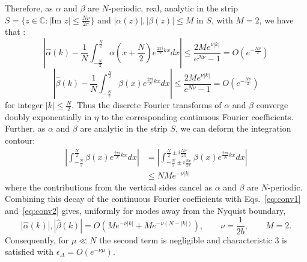 \documentclass[aps,floatfix,10pt,amssymb,amsfont,amsmath,superscriptaddress,float,nofootinbib,longbibliography,nobalancelastpage,twocolumn]{revtex4-2}
\begin{document}
Therefore, as $\alpha$ and $\beta$ are $N$-periodic, real, analytic in the strip $S =\{z \in \mathbb{C}: |\text{Im } z| \leq \frac{N\nu}{2\pi}\}$ and $|\alpha(z)|, |\beta(z)| \leq M$ in $S$, with $M = 2$, we have that \cite{trefethen2014exponentially}:
\begin{equation}
\label{eq:conv1}
    \left|\hat\alpha(k) - \frac{1}{N}\int_{-\frac{N}{2}}^{\frac{N}{2}}\alpha(x+\frac{N}{2})e^{\frac{2\pi i}{N}kx} dx\right| \leq \frac{2 Me^{\nu |k|}}{e^{N\nu}-1} = O(e^{-\frac{N\nu}{2}})
\end{equation}
\begin{equation}
\label{eq:conv2}
    \left|\hat\beta(k) - \frac{1}{N}\int_{-\frac{N}{2}}^{\frac{N}{2}}\beta(x)e^{\frac{2\pi i}{N}kx} dx\right| \leq  \frac{2 Me^{\nu |k|}}{e^{N\nu}-1} = O(e^{-\frac{N\nu}{2}})
\end{equation}
for integer $|k| \leq \frac{N}{2}$. Thus the discrete Fourier transforms of $\alpha$ and $\beta$ converge doubly exponentially in $\eta$ to the corresponding continuous Fourier coefficients. Further, as $\alpha$ and $\beta$ are analytic in the strip $S$, we can deform the integration contour:
\begin{align}
    \left|\int_{-\frac{N}{2}}^{\frac{N}{2}}\beta(x)e^{\frac{2\pi i}{N}kx} dx\right| &=\left| \int_{-\frac{N}{2}\pm i\frac{N\nu}{2\pi}}^{\frac{N}{2}\pm i\frac{N\nu}{2\pi}}\beta(x)e^{\frac{2\pi i}{N}kx} dx\right|\\
    &\leq NMe^{-\nu|k|}
    \label{eq:tails}
\end{align}
where the contributions from the vertical sides cancel as $\alpha$ and $\beta$ are $N$-periodic. Combining this decay of the continuous Fourier coefficients with Eqs.~\eqref{eq:conv1} and~\eqref{eq:conv2} gives, uniformly for modes away from the Nyquist boundary,
\begin{equation}
\label{eq:exactdecay}
    |\hat \alpha(k)|, |\hat \beta(k)| = O\!\left(M e^{-\nu|k|}
    +M e^{-\nu(N-|k|)}\right),
    \qquad \nu = \frac{1}{2b}, \qquad M=2.
\end{equation}
Consequently, for $\mu\ll N$ the second term is negligible and characteristic 3 is satisfied with $\epsilon_{\Delta}=O(e^{-\nu\mu})$.
\end{document}
